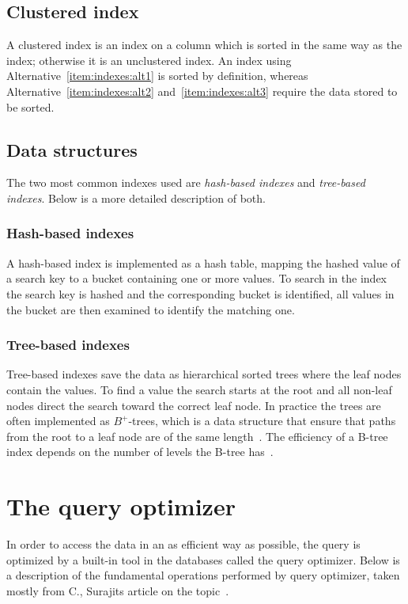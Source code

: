 \subsection{Clustered index}
A clustered index is an index on a column which is sorted in the same way as the
index; otherwise it is an unclustered index. An index using
Alternative~\ref{item:indexes:alt1} is sorted by definition, whereas
Alternative~\ref{item:indexes:alt2} and~\ref{item:indexes:alt3} require the data
stored to be sorted.

\subsection{Data structures}
The two most common indexes used are \textit{hash-based indexes} and \textit{tree-based indexes}. Below is a more detailed description of both.

\subsubsection{Hash-based indexes}
A hash-based index is implemented as a hash table, mapping the hashed value of a search key to a bucket containing one or more values. To search in the index the search key is hashed and the corresponding bucket is identified, all values in the bucket are then examined to identify the matching one.

\subsubsection{Tree-based indexes}
Tree-based indexes save the data as hierarchical sorted trees where the leaf nodes contain the values. To find a value the search starts at the root and all non-leaf nodes direct the search toward the correct leaf node. In practice the trees are often implemented as $B^{+}$-trees, which is a data structure that ensure that paths from the root to a leaf node are of the same length~\cite{comer_1979_ubiquitous_ub}. The efficiency of a B-tree index depends on the number of levels the B-tree has~\cite[p. 645]{garcia-molina_2002_database_dstcb}.

\section{The query optimizer}\label{sec:queryopt}
In order to access the data in an as efficient way as possible, the query is optimized by a built-in tool in the databases called the query optimizer. Below is a description of the fundamental operations performed by query optimizer, taken mostly from C., Surajits article on the topic~\cite{chaudhuri_1998_overview_aooqoirs}.

